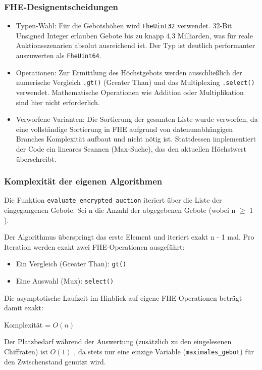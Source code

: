 \subsubsection{FHE-Designentscheidungen}
\begin{itemize}
    \item Typen-Wahl: Für die Gebotshöhen wird \verb|FheUint32| verwendet. 32-Bit Unsigned Integer erlauben Gebote bis zu knapp 4,3 Milliarden, was für reale Auktionsszenarien absolut ausreichend ist. Der Typ ist deutlich performanter auszuwerten als \verb|FheUint64|.
    \item Operationen: Zur Ermittlung des Höchstgebots werden ausschließlich der numerische Vergleich \verb|.gt()| (Greater Than) und das Multiplexing \verb|.select()| verwendet. Mathematische Operationen wie Addition oder Multiplikation sind hier nicht erforderlich.
    \item Verworfene Varianten: Die Sortierung der gesamten Liste wurde verworfen, da eine vollständige Sortierung in FHE aufgrund von datenunabhängigen Branches Komplexität aufbaut und nicht nötig ist. Stattdessen implementiert der Code ein lineares Scannen (Max-Suche), das den aktuellen Höchstwert überschreibt.
\end{itemize}

\subsubsection{Komplexität der eigenen Algorithmen}
Die Funktion \verb|evaluate_encrypted_auction| iteriert über die Liste der eingegangenen Gebote. Sei n die Anzahl der abgegebenen Gebote (wobei n $\geq$ 1 ).\par
Der Algorithmus überspringt das erste Element und iteriert exakt n - 1 mal. Pro Iteration werden exakt zwei FHE-Operationen ausgeführt:
\begin{itemize}
    \item Ein Vergleich (Greater Than): \verb|gt()|
    \item Eine Auswahl (Mux): \verb|select()|
\end{itemize}
Die asymptotische Laufzeit im Hinblick auf eigene FHE-Operationen beträgt damit exakt:\par
\begin{centering}
    Komplexität = $O(n)$
\end{centering}
Der Platzbedarf während der Auswertung (zusätzlich zu den eingelesenen Chiffraten) ist $O(1)$ , da stets nur eine einzige Variable (\verb|maximales_gebot|) für den Zwischenstand genutzt wird.

